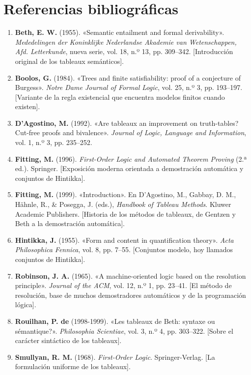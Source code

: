 \section*{Referencias bibliográficas}

\begin{enumerate}
    \item \textbf{Beth, E. W.} (1955). «Semantic entailment and formal derivability». \emph{Mededelingen der Koninklijke Nederlandse Akademie van Wetenschappen, Afd. Letterkunde}, nueva serie, vol. 18, n.º 13, pp. 309--342. [Introducción original de los tableaux semánticos].
    \item \textbf{Boolos, G.} (1984). «Trees and finite satisfiability: proof of a conjecture of Burgess». \emph{Notre Dame Journal of Formal Logic}, vol. 25, n.º 3, pp. 193--197. [Variante de la regla existencial que encuentra modelos finitos cuando existen].
    \item \textbf{D'Agostino, M.} (1992). «Are tableaux an improvement on truth-tables? Cut-free proofs and bivalence». \emph{Journal of Logic, Language and Information}, vol. 1, n.º 3, pp. 235--252.
    \item \textbf{Fitting, M.} (1996). \emph{First-Order Logic and Automated Theorem Proving} (2.ª ed.). Springer. [Exposición moderna orientada a demostración automática y conjuntos de Hintikka].
    \item \textbf{Fitting, M.} (1999). «Introduction». En D'Agostino, M., Gabbay, D. M., Hähnle, R., \& Posegga, J. (eds.), \emph{Handbook of Tableau Methods}. Kluwer Academic Publishers. [Historia de los métodos de tableaux, de Gentzen y Beth a la demostración automática].
    \item \textbf{Hintikka, J.} (1955). «Form and content in quantification theory». \emph{Acta Philosophica Fennica}, vol. 8, pp. 7--55. [Conjuntos modelo, hoy llamados conjuntos de Hintikka].
    \item \textbf{Robinson, J. A.} (1965). «A machine-oriented logic based on the resolution principle». \emph{Journal of the ACM}, vol. 12, n.º 1, pp. 23--41. [El método de resolución, base de muchos demostradores automáticos y de la programación lógica].
    \item \textbf{Rouilhan, P. de} (1998-1999). «Les tableaux de Beth: syntaxe ou sémantique?». \emph{Philosophia Scientiae}, vol. 3, n.º 4, pp. 303--322. [Sobre el carácter sintáctico de los tableaux].
    \item \textbf{Smullyan, R. M.} (1968). \emph{First-Order Logic}. Springer-Verlag. [La formulación uniforme de los tableaux].
\end{enumerate}

